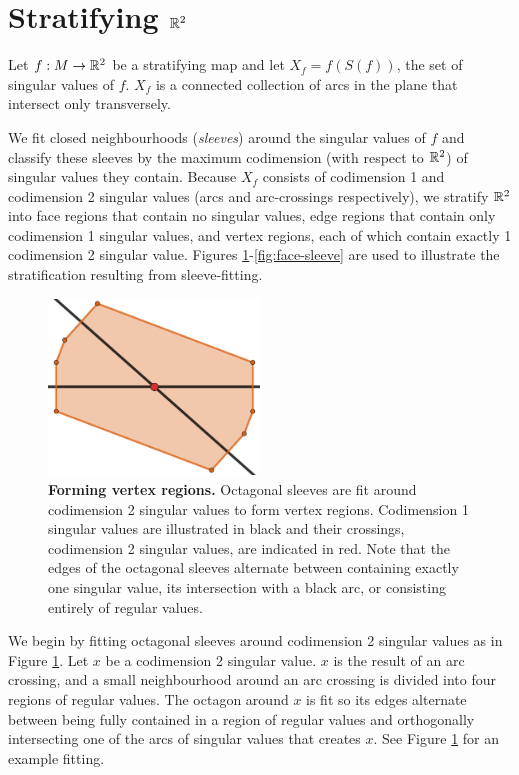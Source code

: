 \section{Stratifying $\mathbb{R}^2$}
\label{section:smooth-decompose}

Let $f:M\to\mathbb{R}^2$ be a stratifying map and let $X_f = f(S(f))$, the set of singular values of $f$.
$X_f$ is a connected collection of arcs in the plane that intersect only transversely.

We fit closed neighbourhoods (\emph{sleeves}) around the singular values of $f$ and classify these sleeves by the maximum codimension (with respect to $\mathbb{R}^2$) of singular values they contain.
Because $X_f$ consists of codimension 1 and codimension 2 singular values (arcs and arc-crossings respectively), we stratify $\mathbb{R}^2$ into face regions that contain no singular values, edge regions that contain only codimension 1 singular values, and vertex regions, each of which contain exactly 1 codimension 2 singular value.
Figures \ref{fig:vertex-sleeve}-\ref{fig:face-sleeve} are used to illustrate the stratification resulting from sleeve-fitting.

\begin{figure}[h!]
	\centering
	\includegraphics[width=0.5\textwidth]{figures/vertex-sleeve.png}
	\caption{
		\textbf{Forming vertex regions.}
		Octagonal sleeves are fit around codimension 2 singular values to form vertex regions.
		Codimension 1 singular values are illustrated in black and their crossings, codimension 2 singular values, are indicated in red.
		Note that the edges of the octagonal sleeves alternate between containing exactly one singular value, its intersection with a black arc, or consisting entirely of regular values.
	}
	\label{fig:vertex-sleeve}
\end{figure}

We begin by fitting octagonal sleeves around codimension 2 singular values as in Figure \ref{fig:vertex-sleeve}.
Let $x$ be a codimension 2 singular value.
$x$ is the result of an arc crossing, and a small neighbourhood around an arc crossing is divided into four regions of regular values.
The octagon around $x$ is fit so its edges alternate between being fully contained in a region of regular values and orthogonally intersecting one of the arcs of singular values that creates $x$.
See Figure \ref{fig:vertex-sleeve} for an example fitting.


